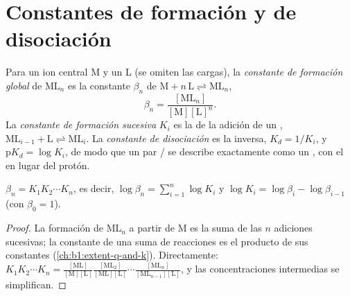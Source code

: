 \section{Constantes de formación y de disociación}

\begin{definition}\label{def:b1:complexation:formation-constant}
Para un ion central M y un  L (se omiten las cargas), la
\emph{constante de formación global} de
$\mathrm{ML}_n$ es la constante $\beta_n$ de
$\mathrm{M} + n\,\mathrm{L} \rightleftharpoons \mathrm{ML}_n$,
\[
  \beta_n = \frac{[\mathrm{ML}_n]}{[\mathrm{M}][\mathrm{L}]^n} .
\]
La \emph{constante de formación sucesiva}
$K_i$ es la de la adición de un ,
$\mathrm{ML}_{i-1} + \mathrm{L} \rightleftharpoons \mathrm{ML}_i$. La
\emph{constante de disociación} es la
inversa, $K_d = 1/K_i$, y $\mathrm{p}K_d = \log K_i$, de modo que un par
/ se describe exactamente como un , con el
 en lugar del protón.
\end{definition}

\begin{proposition}\label{prop:b1:complexation:beta-k}
$\beta_n = K_1 K_2 \cdots K_n$, es decir,
$\log\beta_n = \sum_{i=1}^n \log K_i$ y $\log K_i = \log\beta_i -
\log\beta_{i-1}$ (con $\beta_0 = 1$).
\end{proposition}

\begin{proof}
La formación de $\mathrm{ML}_n$ a partir de M es la suma de las $n$
adiciones sucesivas; la constante de una suma de reacciones es el
producto de sus constantes (\cref{ch:b1:extent-q-and-k}). Directamente:
$K_1 K_2\cdots K_n = \frac{[\mathrm{ML}]}{[\mathrm{M}][\mathrm{L}]}
\frac{[\mathrm{ML_2}]}{[\mathrm{ML}][\mathrm{L}]}\cdots
\frac{[\mathrm{ML}_n]}{[\mathrm{ML}_{n-1}][\mathrm{L}]}$, y las
concentraciones intermedias se simplifican.
\end{proof}

